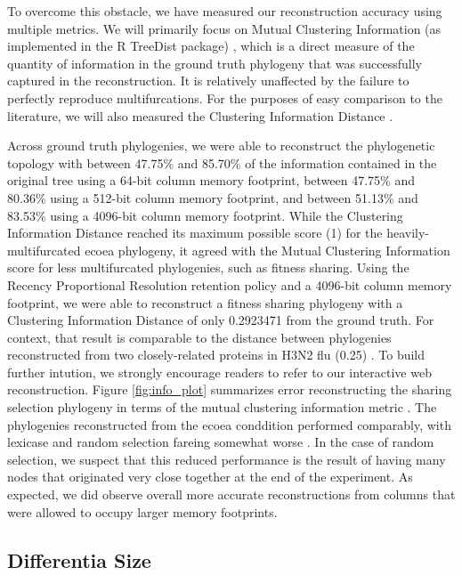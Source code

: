 To overcome this obstacle, we have measured our reconstruction accuracy using multiple metrics.
We will primarily focus on Mutual Clustering Information (as implemented in the R TreeDist package) \citep{smith2020treedist}, which is a direct measure of the quantity of information in the ground truth phylogeny that was successfully captured in the reconstruction.
It is relatively unaffected by the failure to perfectly reproduce multifurcations.
For the purposes of easy comparison to the literature, we will also measured the Clustering Information Distance \citep{smith2020treedist}.



Across ground truth phylogenies, we were able to reconstruct the phylogenetic topology with between 47.75\% and 85.70\% of the information contained in the original tree using a 64-bit column memory footprint, between 47.75\% and 80.36\% using a 512-bit column memory footprint, and between 51.13\% and 83.53\% using a 4096-bit column memory footprint.
While the Clustering Information Distance reached its maximum possible score (1) for the heavily-multifurcated ecoea phylogeny, it agreed with the Mutual Clustering Information score for less multifurcated phylogenies, such as fitness sharing.
Using the Recency Proportional Resolution retention policy and a 4096-bit column memory footprint, we were able to reconstruct a fitness sharing phylogeny with a Clustering Information Distance of only 0.2923471 from the ground truth.
For context, that result is comparable to the distance between phylogenies reconstructed from two closely-related proteins in H3N2 flu (0.25) \citep{jones2021parallel}.
To build further intution, we strongly encourage readers to refer to our interactive web reconstruction.
Figure \ref{fig:info_plot} summarizes error reconstructing the sharing selection phylogeny in terms of the mutual clustering information metric \citep{smith2022robust}.
The phylogenies reconstructed from the ecoea conddition performed comparably, with lexicase and random selection fareing somewhat worse \citep{moreno2022hstratconceptsupplement}. %
In the case of random selection, we suspect that this reduced performance is the result of having many nodes that originated very close together at the end of the experiment.
As expected, we did observe overall more accurate reconstructions from columns that were allowed to occupy larger memory footprints.

\subsection{Differentia Size}

